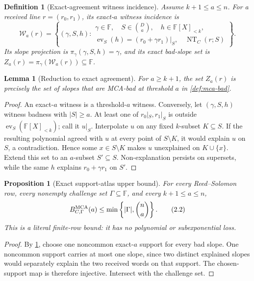 \documentclass[11pt,a4paper]{amsart}
\numberwithin{equation}{section}
\newtheorem{proposition}[proposition]{Proposition}
\newtheorem{lemma}[lemma]{Lemma}
\newtheorem{definition}[definition]{Definition}
\theoremstyle{remark}
\newcommand{\F}{\mathbb F}
\newcommand{\Wcal}{\mathcal W}
\newcommand{\abs}[1]{\lvert #1\rvert}
\begin{document}
\begin{definition}[Exact-agreement witness incidence]
\label{def:exact-witness-incidence}
Assume \(k+1\le a\le n\).  For a received line \(r=(r_0,r_1)\), its
exact-\(a\) witness incidence is
\[
 \Wcal_a(r)=\left\{(\gamma,S,h):
 \begin{array}{l}
   \gamma\in\F,\quad S\in\binom Da,\quad h\in\F[X]_{<k},\\
   \operatorname{ev}_S(h)=(r_0+\gamma r_1)|_S,\quad
   \operatorname{NT}_C(r;S)
 \end{array}\right\}.
 \tag{2.1}\label{eq:exact-witness-incidence}
\]
Its slope projection is
\(\pi_\gamma(\gamma,S,h)=\gamma\), and its exact bad-slope set is
\(Z_a(r)=\pi_\gamma(\Wcal_a(r))\subseteq\F\).
\end{definition}

\begin{lemma}[Reduction to exact agreement]
\label{lem:exact-agreement-reduction}
For \(a\ge k+1\), the set \(Z_a(r)\) is precisely the set of slopes that
are MCA-bad at threshold \(a\) in \cref{def:mca-bad}.
\end{lemma}

\begin{proof}
An exact-\(a\) witness is a threshold-\(a\) witness.  Conversely, let
\((\gamma,S,h)\) witness badness with \(\abs S\ge a\).  At least one of
\(r_0|_S,r_1|_S\) is outside
\(\operatorname{ev}_S(\F[X]_{<k})\); call it \(u|_S\).  Interpolate \(u\)
on any fixed \(k\)-subset \(K\subseteq S\).  If the resulting polynomial
agreed with \(u\) at every point of \(S\setminus K\), it would explain
\(u\) on \(S\), a contradiction.  Hence some \(x\in S\setminus K\)
makes \(u\) unexplained on \(K\cup\{x\}\).  Extend this set to an
\(a\)-subset \(S'\subseteq S\).  Non-explanation persists on supersets,
while the same \(h\) explains \(r_0+\gamma r_1\) on \(S'\).
\end{proof}

\begin{proposition}[Exact support-atlas upper bound]
\label{prop:exact-support-upper}
For every Reed--Solomon row, every nonempty challenge set
\(\Gamma\subseteq\F\), and every \(k+1\le a\le n\),
\[
 B_{C,\Gamma}^{\rm MCA}(a)
 \le\min\left\{\abs\Gamma,\binom na\right\}.        \tag{2.2}
\]
This is a literal finite-row bound: it has no polynomial or
subexponential loss.
\end{proposition}

\begin{proof}
By \cref{lem:exact-agreement-reduction}, choose one noncommon exact-\(a\)
support for every bad slope.  One noncommon support carries at most one
slope, since two distinct explained slopes would separately explain the
two received words on that support.  The chosen-support map is therefore
injective.  Intersect with the challenge set.
\end{proof}
\end{document}

